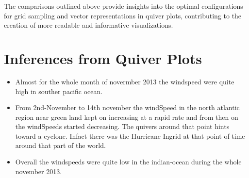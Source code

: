 \documentclass[conference]{IEEEtran}
\begin{document}
The comparisons outlined above provide insights into the optimal configurations for grid sampling and vector representations in quiver plots, contributing to the creation of more readable and informative visualizations.




\section{Inferences from Quiver Plots}

\begin{itemize}
  \item Almost for the whole month of novermber 2013 the windspeed were quite high in souther pacific ocean.

  \item From 2nd-November to 14th november the windSpeed in the north atlantic region near green land kept on increasing at a rapid rate and from then on the windSpeeds started decreasing. The quivers around that point hints toward a cyclone. Infact there was the Hurricane Ingrid at that point of time around that part of the world.

  \item Overall the windspeeds were quite low in the indian-ocean during the whole november 2013.

\end{itemize}
\end{document}
